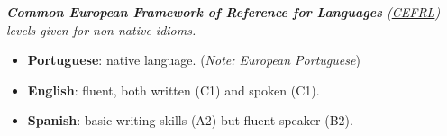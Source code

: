\documentclass[a4paper,10pt]{extarticle}
\newenvironment{topic}[1]
   {{\noindent\large\bfseries\raisebox{0pt}[\height][1ex]{#1}\hrule\par}%
    \begin{list}{}{%
       \setlength{\leftmargin}{.0cm}}\item[]}
   {\end{list}\medskip}
\begin{document}
\begin{topic}{Languages}
  {\hspace*{2em} \slshape \small \textbf{Common European Framework of Reference for Languages} 
	(\href{http://en.wikipedia.org/wiki/Common\_European\_Framework\_of\_Reference\_for\_Languages#Common\_reference\_levels}{CEFRL}) 
	levels given for non-native idioms.}
  \begin{itemize}[leftmargin=*]
    \item {\bfseries Portuguese}: native language. (\emph{Note: European Portuguese})
    \item {\bfseries English}: fluent, both written (C1) and spoken (C1).
    \item {\bfseries Spanish}: basic writing skills (A2) but fluent speaker (B2).
  \end{itemize}
\end{topic}
\end{document}
